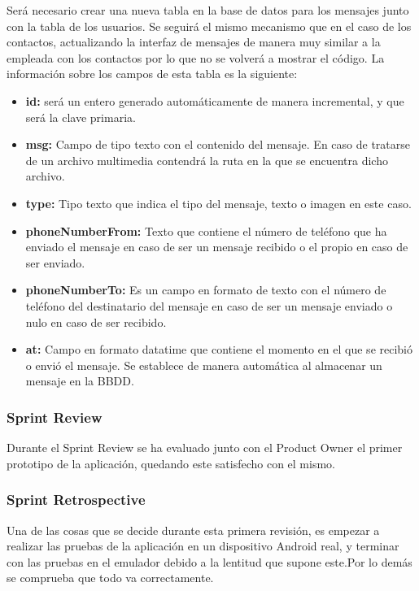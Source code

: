 Será necesario crear una nueva tabla en la base de datos para los mensajes junto con la tabla de los usuarios. Se seguirá el mismo mecanismo que en el caso de los contactos, actualizando la interfaz de mensajes de manera muy similar a la empleada con los contactos por lo que no se volverá a mostrar el código. La información sobre los campos de esta tabla es la siguiente:

\begin{itemize}
\item \textbf{\textunderscore id:} será un entero generado automáticamente de manera incremental, y que será la clave primaria.
\item \textbf{msg:} Campo de tipo texto con el contenido del mensaje. En caso de tratarse de un archivo multimedia contendrá la ruta en la que se encuentra dicho archivo.
\item \textbf{type:} Tipo texto que indica el tipo del mensaje, texto o imagen en este caso.
\item \textbf{phoneNumberFrom:} Texto que contiene el número de teléfono que ha enviado el mensaje en caso de ser un mensaje recibido o el propio en caso de ser enviado.
\item  \textbf{phoneNumberTo:} Es un campo en formato de texto con el número de teléfono del destinatario del mensaje en caso de ser un mensaje enviado o nulo en caso de ser recibido.
\item \textbf{at:} Campo en formato datatime que contiene el momento en el que se recibió o envió el mensaje. Se establece de manera automática al almacenar un mensaje en la \ac{BBDD}.
\end{itemize}



\subsubsection{Sprint Review}

Durante el Sprint Review se ha evaluado junto con el Product Owner el primer prototipo de la aplicación, quedando este satisfecho con el mismo. 

\subsubsection{Sprint Retrospective}

Una de las cosas que se decide durante esta primera revisión, es empezar a realizar las pruebas de la aplicación en un dispositivo Android real, y terminar con las pruebas en el emulador debido a la lentitud que supone este.Por lo demás se comprueba que todo va correctamente.

